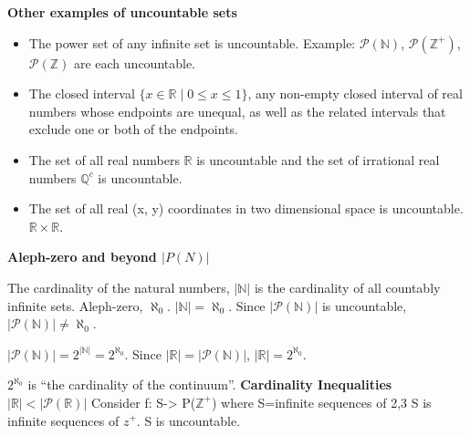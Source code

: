 \documentclass[10pt]{article}
\begin{document}
\begin{multicols}{3}
\hrulefill
\textbf{Other examples of uncountable sets}
\begin{itemize}
\item The power set of any infinite set is uncountable. Example: $\mathcal{P}(\mathbb{N})$, $\mathcal{P}(\mathbb{Z}^+)$, $\mathcal{P}(\mathbb{Z})$ are each uncountable.
\item The closed interval $\{x \in \mathbb{R} \mid 0 \leq x \leq 1\}$, any non-empty closed interval of real numbers whose endpoints are unequal, as well as the related intervals that exclude one or both of the endpoints.
\item The set of all real numbers $\mathbb{R}$ is uncountable and the set of irrational real numbers $\mathbb{Q}^c$ is uncountable.
\item The set of all real (x, y) coordinates in two dimensional space is uncountable. $\mathbb{R} \times \mathbb{R}$.
\end{itemize}
\hrulefill
\textbf{Aleph-zero and beyond $|P(N)|$}

The cardinality of the natural numbers, $|\mathbb{N}|$ is the cardinality of all countably infinite sets. Aleph-zero, $\aleph_0$.  $|\mathbb{N}| = \aleph_0$. Since $|\mathcal{P}(\mathbb{N})|$ is uncountable, $|\mathcal{P}(\mathbb{N})| \neq \aleph_0$.

$|\mathcal{P}(\mathbb{N})| = 2^{|\mathbb{N}|} = 2^{\aleph_0}$.  Since $|\mathbb{R}| = |\mathcal{P}(\mathbb{N})|$, $|\mathbb{R}| = 2^{\aleph_0}$.

$2^{\aleph_0}$ is “the cardinality of the continuum”.
\hrulefill
\textbf{Cardinality Inequalities} $|\mathbb{R}| < |\mathcal{P}(\mathbb{R})|$
Consider f: S-> P($\mathbb{Z}^+$)
where S=infinite sequences of {2,3}
S is infinite sequences of $z^+$. S is uncountable.
\end{multicols}
\end{document}
